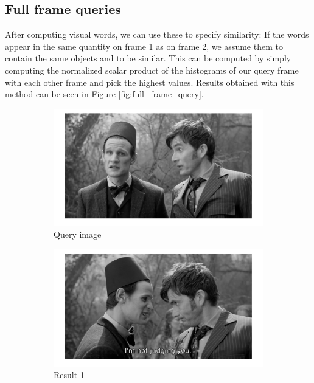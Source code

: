 \documentclass{paper}
\begin{document}
\subsection{Full frame queries}
After computing visual words, we can use these to specify similarity: If the words appear
in the same quantity on frame 1 as on frame 2, we assume them to contain the same objects
and to be similar. This can be computed by simply computing the normalized
 scalar product of the histograms of our 
query frame with each other frame and pick the highest values. Results obtained with this
method can be seen in Figure \ref{fig:full_frame_query}. 
\begin{figure}
  \centering
  \begin{subfigure}[b]{0.32\textwidth}
    \includegraphics[width=\textwidth]{full_frame_query_img}
    \caption{Query image}
  \end{subfigure}
  \begin{subfigure}[b]{0.32\textwidth}
  	\includegraphics[width=\textwidth]{full_frame_query_result1}
  	\caption{Result 1}
  \end{subfigure}
  \begin{subfigure}[b]{0.32\textwidth}

\end{subfigure}
\end{figure}
\end{document}
